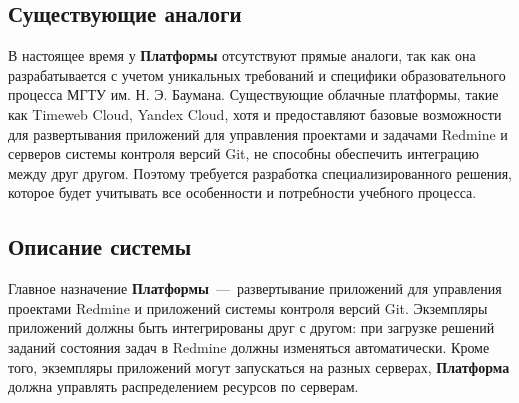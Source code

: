 %

\subsection*{Существующие аналоги}

В настоящее время у \textbf{Платформы} отсутствуют прямые аналоги, так как она разрабатывается с учетом уникальных требований и специфики образовательного процесса МГТУ им. Н. Э. Баумана. Существующие облачные платформы, такие как Timeweb Cloud, Yandex Cloud, хотя и предоставляют базовые возможности для развертывания приложений для управления проектами и задачами Redmine и серверов системы контроля версий Git, не способны обеспечить  интеграцию между друг другом. Поэтому требуется разработка специализированного решения, которое будет учитывать все особенности и потребности учебного процесса.

\subsection*{Описание системы}

Главное назначение \textbf{Платформы}~---~развертывание приложений для управления проектами Redmine и приложений системы контроля версий Git. Экземпляры приложений должны быть интегрированы друг с другом: при загрузке решений заданий состояния задач в Redmine должны изменяться автоматически. Кроме того, экземпляры приложений могут запускаться на разных серверах, \textbf{Платформа} должна управлять распределением ресурсов по серверам. 

